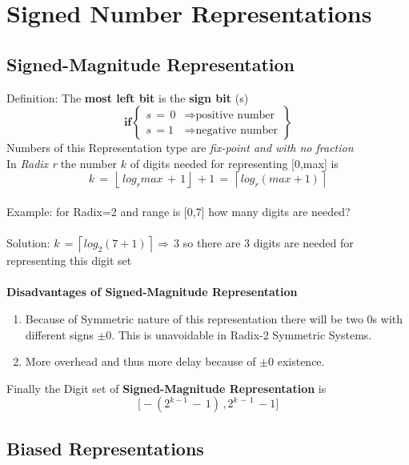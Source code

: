 \section{Signed Number Representations}
\subsection{Signed-Magnitude Representation}
Definition: The \textbf{most left bit} is the \textbf{sign bit} (s) \[
	\mathbf{if}
\left\{\begin{array}{cl}
	s\,=\,0 & \Longrightarrow \text{positive number}\\s\,=1 & \Longrightarrow \text{negative number} 
\end{array}\right\}
\]
Numbers of this Representation type are \textit{fix-point and with no fraction}\\
In \textit{Radix r} the number \(k\)  of digits needed for representing [0,max] is
\[
	k\,=\,\left\lfloor\,log_{r}max\,+\,1 \right\rfloor\,+1\,=\,\left\lceil log_{r}(max+1) \right\rceil 
\]
\\
Example: for Radix=2 and range is [0,7] how many digits are needed?
\\\\Solution: \(k\,=\left\lceil log_{2}(7+1) \right\rceil \Longrightarrow\, 3\) so there are 3 digits are needed for representing this digit set\\\\
\textbf{Disadvantages of Signed-Magnitude Representation}
\begin{enumerate}
	\item Because of Symmetric nature of this representation there will be two \(0\)s with different signs \(\pm0\). This is unavoidable in Radix-2 Symmetric Systems.
	\item More overhead and thus more delay because of \(\pm0\) existence.
\end{enumerate}
Finally the Digit set of \textbf{Signed-Magnitude Representation} is 
\[
	\big[-(2^{k-1}\,-\,1)\,,2^{k\,-\,1}\,-1\big]
\]


\subsection{Biased Representations}
